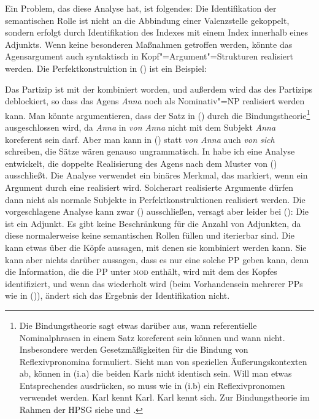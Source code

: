 {Ein Problem, das diese Analyse hat, ist folgendes: Die Identifikation der semantischen Rolle
ist nicht an die Abbindung einer Valenzstelle gekoppelt, sondern erfolgt durch Identifikation
des Indexes mit einem Index innerhalb eines Adjunkts. Wenn keine besonderen Maßnahmen getroffen
werden, könnte das Agensargument auch syntaktisch in Kopf"=Argument"=Strukturen realisiert werden.
Die Perfektkonstruktion in () ist ein Beispiel: 

\z
Das Partizip ist mit der \vonpp kombiniert worden, und außerdem wird das \subj des Partizips
deblockiert, so dass das Agens \emph{Anna} noch als Nominativ"=NP realisiert werden kann.
Man könnte argumentieren, dass der Satz in () durch die Bindungstheorie\footnote{
  Die Bindungstheorie sagt etwas darüber aus, wann referentielle Nominalphrasen in einem Satz
  koreferent sein können und wann nicht. Insbesondere werden Gesetzmäßigkeiten für die
  Bindung von Reflexivpronomina formuliert. Sieht man von speziellen Äußerungskontexten ab,
  können in (i.a) die beiden Karls nicht identisch sein.
  Will man etwas Entsprechendes ausdrücken, so muss wie in (i.b) ein Reflexivpronomen verwendet werden.
\eal
\ex Karl kennt Karl.
\ex Karl kennt sich.
\zl
  Zur Bindungstheorie im Rahmen der HPSG siehe  und .%
} ausgeschlossen wird, da \emph{Anna} in \emph{von Anna} nicht mit dem Subjekt \emph{Anna} koreferent sein darf.
Aber man kann in () statt \emph{von Anna} auch \emph{von sich} schreiben, 
die Sätze wären genauso ungrammatisch. In  habe ich eine Analyse entwickelt,
die doppelte Realisierung des Agens nach dem Muster von () ausschließt. Die Analyse
verwendet ein binäres Merkmal, das markiert, wenn ein Argument durch eine \vonpp realisiert
wird. Solcherart realisierte Argumente dürfen dann nicht als normale Subjekte in Perfektkonstruktionen
realisiert werden. Die vorgeschlagene Analyse kann zwar () ausschließen, versagt aber
leider bei ():
\eal
{}
\zl
Die \vonpp ist ein Adjunkt. Es gibt keine Beschränkung für die Anzahl von Adjunkten, da
diese normalerweise keine semantischen Rollen füllen und iterierbar sind. Die \vonpp kann etwas über die Köpfe
aussagen, mit denen sie kombiniert werden kann. Sie kann aber nichts darüber aussagen, dass
es nur eine solche PP geben kann, denn die Information, die die PP unter \textsc{mod} enthält, wird mit dem
\synsemw des Kopfes identifiziert, und wenn das wiederholt wird (beim Vorhandensein mehrerer PPs wie
in ()), ändert sich das Ergebnis der Identifikation nicht.

}

